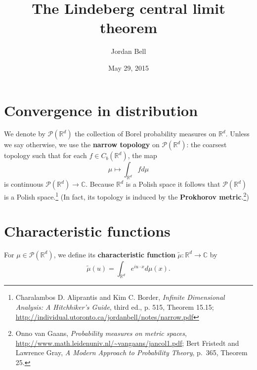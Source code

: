\documentclass{article}
\theoremstyle{definition}
\theoremstyle{definition}
\begin{document}
\title{The  Lindeberg central limit theorem}
\author{Jordan Bell}
\date{May 29, 2015}

\maketitle


\section{Convergence in distribution}
We denote by $\mathscr{P}(\mathbb{R}^d)$ the collection of Borel probability measures on $\mathbb{R}^d$.
Unless we say otherwise, we use the \textbf{narrow topology} on $\mathscr{P}(\mathbb{R}^d)$: the coarsest
topology such that for each $f \in C_b(\mathbb{R}^d)$, the map
\[
\mu \mapsto \int_{\mathbb{R}^d} f d\mu
\]
is continuous $\mathscr{P}(\mathbb{R}^d) \to \mathbb{C}$. 
Because $\mathbb{R}^d$ is a Polish space it follows that $\mathscr{P}(\mathbb{R}^d)$ is a Polish space.\footnote{Charalambos D. Aliprantis and Kim C. Border, {\em Infinite Dimensional Analysis: A Hitchhiker's
Guide}, third ed., p. 515, Theorem 15.15; \url{http://individual.utoronto.ca/jordanbell/notes/narrow.pdf}}
(In fact, its topology is induced by the \textbf{Prokhorov metric}.\footnote{Onno van Gaans, 
{\em Probability measures on metric spaces}, \url{http://www.math.leidenuniv.nl/~vangaans/jancol1.pdf};
Bert Fristedt and Lawrence Gray, {\em A Modern Approach to Probability Theory}, p.~365, Theorem 25.})



\section{Characteristic functions}
For $\mu \in \mathscr{P}(\mathbb{R}^d)$, we define its \textbf{characteristic function}
$\tilde{\mu}:\mathbb{R}^d \to \mathbb{C}$ by
\[
\tilde{\mu}(u) = \int_{\mathbb{R}^d} e^{iu\cdot x} d\mu(x).
\]
\end{document}
